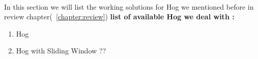 \paragraph{}
In this section we will list the working solutions for Hog we mentioned before in review chapter(~\ref{chapter:review})\newline
\textbf{list of available Hog we deal with :}
\begin{enumerate}
	\item Hog
	\item Hog with Sliding Window
	??	
\end{enumerate}
\paragraph{}

